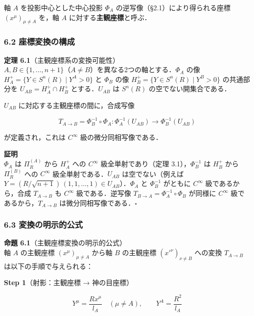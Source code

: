 \documentclass[a4paper,11pt]{ltjsarticle}
\theoremstyle{definition}
\begin{document}
軸 \(A\) を投影中心とした中心投影 \(\Phi_A\) の逆写像（§2.1）により得られる座標 \((x^\mu)_{\mu \neq A}\) を，軸 \(A\) に対する\textbf{主観座標}と呼ぶ．

\subsubsection{6.2 座標変換の構成}\label{ux5ea7ux6a19ux5909ux63dbux306eux69cbux6210}

\textbf{定理 6.1}（主観座標系の変換可能性）\\
\(A, B \in \{1, \ldots, n+1\}\)（\(A \neq B\)）を異なる2つの軸とする．\(\Phi_A\) の像 \(H_A^+ = \{Y \in S^n(R) \mid Y^A > 0\}\) と \(\Phi_B\) の像 \(H_B^+ = \{Y \in S^n(R) \mid Y^B > 0\}\) の共通部分を \(U_{AB} = H_A^+ \cap H_B^+\) とする．\(U_{AB}\) は \(S^n(R)\) の空でない開集合である．

\(U_{AB}\) に対応する主観座標の間に，合成写像

\[T_{A \to B} = \Phi_B^{-1} \circ \Phi_A: \Phi_A^{-1}(U_{AB}) \to \Phi_B^{-1}(U_{AB}) \tag{6.1}\]

が定義され，これは \(C^\infty\) 級の微分同相写像である．

\textbf{証明}\\
\(\Phi_A\) は \(\Pi_R^{(A)}\) から \(H_A^+\) への \(C^\infty\) 級全単射であり（定理 3.1），\(\Phi_B^{-1}\) は \(H_B^+\) から \(\Pi_R^{(B)}\) への \(C^\infty\) 級全単射である．\(U_{AB}\) は空でない（例えば \(Y = (R/\sqrt{n+1})\,(1,1,\ldots,1) \in U_{AB}\)）．\(\Phi_A\) と \(\Phi_B^{-1}\) がともに \(C^\infty\) 級であるから，合成 \(T_{A \to B}\) も \(C^\infty\) 級である．逆写像 \(T_{B \to A} = \Phi_A^{-1} \circ \Phi_B\) が同様に \(C^\infty\) 級であるから，\(T_{A \to B}\) は微分同相写像である．\(\square\)

\subsubsection{6.3 変換の明示的公式}\label{ux5909ux63dbux306eux660eux793aux7684ux516cux5f0f}

\textbf{命題 6.1}（主観座標変換の明示的公式）\\
軸 \(A\) の主観座標 \((x^\mu)_{\mu \neq A}\) から軸 \(B\) の主観座標 \((x'^\nu)_{\nu \neq B}\) への変換 \(T_{A \to B}\) は以下の手順で与えられる：

\textbf{Step 1}（射影：主観座標 → 神の目座標）

\[Y^\mu = \frac{Rx^\mu}{l_A} \quad (\mu \neq A), \qquad Y^A = \frac{R^2}{l_A} \tag{6.2}\]
\end{document}
